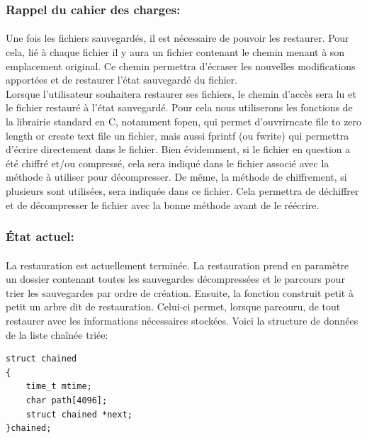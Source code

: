         \subsubsection{Rappel du cahier des charges:}
        \paragraph*{}
        Une fois les fichiers sauvegardés, il est nécessaire de pouvoir les restaurer. Pour cela, lié à chaque fichier il y aura un fichier contenant le chemin menant à son emplacement original. Ce chemin permettra d'écraser les nouvelles modifications apportées et de restaurer l'état sauvegardé du fichier. \\
        Lorsque l'utilisateur souhaitera restaurer ses fichiers, le chemin d'accès sera lu et le fichier restauré à l'état sauvegardé. Pour cela nous utiliserons les fonctions de la librairie standard en C, notamment fopen, qui permet d'ouvrirncate file to zero length or create text file  un fichier, mais aussi fprintf (ou fwrite) qui permettra d'écrire directement dans le fichier.
        Bien évidemment, si le fichier en question a été chiffré et/ou compressé, cela sera indiqué dans le fichier associé avec la méthode à utiliser pour décompresser. De même, la méthode de chiffrement, si plusieurs sont utilisées, sera indiquée dans ce fichier. Cela permettra de déchiffrer et de décompresser le fichier avec la bonne méthode avant de le réécrire.
        \subsubsection{État actuel:}
            \paragraph*{}
            La restauration est actuellement terminée. La restauration prend en paramètre un dossier contenant toutes les sauvegardes décompressées et le parcours pour trier les sauvegardes par ordre de création. Ensuite, la fonction construit petit à petit un arbre dit de restauration. Celui-ci permet, lorsque parcouru, de tout restaurer avec les informations nécessaires stockées. Voici la structure de données de la liste chaînée triée:\\
            \begin{lstlisting}[style=CStyle]
struct chained
{
    time_t mtime;
    char path[4096];
    struct chained *next;
}chained;
            \end{lstlisting}\\
